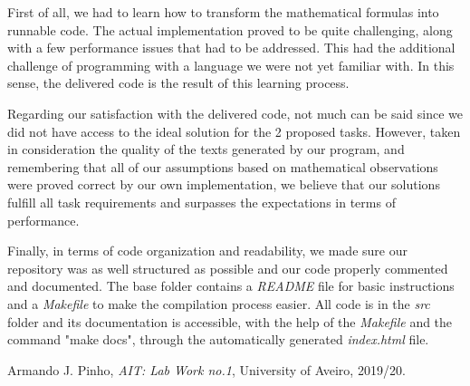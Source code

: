 \documentclass[12pt]{article}
\begin{document}
First of all, we had to learn how to transform the mathematical formulas into 
runnable code.
The actual implementation proved to be quite challenging, along with a few
performance issues that had to be addressed.
This had the additional challenge of programming with a language we were not 
yet familiar with.
In this sense, the delivered code is the result of this learning process.

Regarding our satisfaction with the delivered code, not much can be said since
we did not have access to the ideal solution for the 2 proposed tasks.
However, taken in consideration the quality of the texts generated by our 
program, and remembering that all of our assumptions based on mathematical
observations were proved correct by our own implementation, we believe that
our solutions fulfill all task requirements and surpasses the expectations in 
terms of performance.

Finally, in terms of code organization and readability, we made sure our 
repository was as well structured as possible and our code properly commented
and documented.
The base folder contains a {\it README\/} file for basic instructions and a 
{\it Makefile\/} to make the compilation process easier.
All code is in the {\it src\/} folder and its documentation is accessible, 
with the help of the {\it Makefile\/} and the command "make docs", through
the automatically generated {\it index.html\/} file.

\begin{thebibliography}{9}
  

    Armando J. Pinho,
    \textit{AIT: Lab Work no.1},
    University of Aveiro,
    2019/20.
  
\end{thebibliography}

\clearpage
\end{document}
